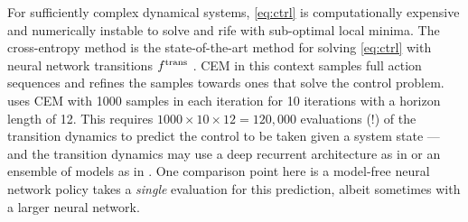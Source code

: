 \documentclass{article}
\begin{document}
For sufficiently complex dynamical systems, \cref{eq:ctrl}
is computationally expensive and numerically instable to solve
and rife with sub-optimal local minima.
The cross-entropy method is the state-of-the-art method for
solving \cref{eq:ctrl} with neural network
transitions $f^{\mathrm{trans}}$ \citep{chua2018deep,hafner2018learning}.
CEM in this context samples full action sequences and refines
the samples towards ones that solve the control problem.
\citet{hafner2018learning} uses CEM with 1000 samples in each
iteration for 10 iterations with a horizon length of 12.
This requires $1000\times 10\times 12=120,000$ evaluations (!) of
the transition dynamics to predict the control to be taken
given a system state --- and the transition dynamics may use
a deep recurrent architecture as in \citet{hafner2018learning}
or an ensemble of models as in \citet{chua2018deep}.
One comparison point here is a model-free neural network policy
takes a \emph{single} evaluation for this prediction,
albeit sometimes with a larger neural network.
\end{document}
